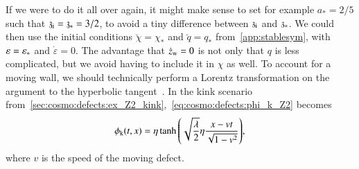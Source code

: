 If we were to do it all over again, it might make sense to set %
for example 
$a_\ast = 2/5$ such that $\mathfrak{z}_\mathrm{i}=\mathfrak{z}_\ast = 3/2$, 
to avoid a tiny difference between $\mathfrak{z}_\mathrm{i}$ and $\mathfrak{z}_\ast$. %
We could then use the initial conditions $\breve{\chi}=\chi_\ast$ and $\breve{q}=q_\ast$ from~\cref{app:stablesym}, with $\varepsilon=\varepsilon_\ast$ and $\dot{\varepsilon}=0$. %
The advantage that $\dot{z}_\mathrm{w}=0$ is not only that $q$ is less complicated, but we avoid having to include it in $\chi$ as well. To account for a moving wall, we should technically perform a Lorentz transformation on the argument to the hyperbolic tangent~\citep{vachaspatiKinksDomainWalls2006,blanco-pilladoDynamicsDomainWall2023}. In the kink scenario from~\cref{sec:cosmo:defects:ex_Z2_kink},~\cref{eq:cosmo:defects:phi_k_Z2} becomes~\citep{vachaspatiKinksDomainWalls2006}
\begin{equation}
    \phi_\mathrm{k}(t, x ) = \eta \tanh{{\left( \sqrt{\frac{\lambda}{2}}\eta  \frac{x - vt}{\sqrt{1-v^2}}  \right)}},
\end{equation}
where $v$ is the speed of the moving defect.










